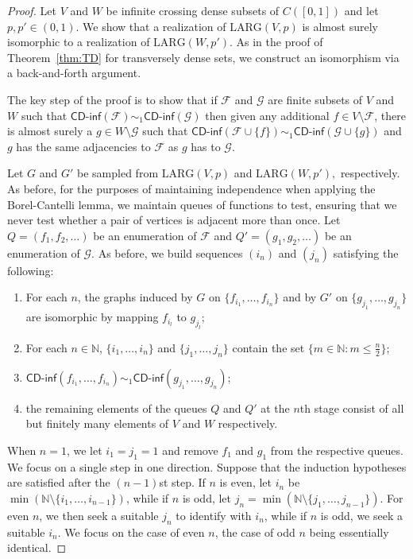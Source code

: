 \documentclass{daj}
\newcommand{\LARG}{\mathrm{LARG}}
\newcommand{\N}{\mathbb N}
\newcommand{\cdinf}{\textsf{CD-inf}}
\begin{document}
\begin{proof}
Let $V$ and $W$ be infinite crossing dense subsets of $C([0,1])$ and let $p,p'\in(0,1)$.
We show that a realization of $\LARG(V,p)$ is almost surely isomorphic to a realization of $\LARG(W,p')$.
As in the proof of Theorem~\ref{thm:TD} for transversely dense sets, we construct an isomorphism
via a back-and-forth argument.

The key step of the proof is to show that if $\mathcal F$ and $\mathcal G$ are finite subsets of $V$ and $W$
such that $\cdinf(\mathcal F)\sim_1\cdinf(\mathcal G)$ then given any additional
$f\in V\setminus\mathcal F$,
there is almost surely a $g\in W\setminus\mathcal G$ such that
$\cdinf(\mathcal F\cup \{f\})\sim_1\cdinf(\mathcal G\cup
\{g\})$ and $g$ has the same adjacencies to $\mathcal F$ as $g$ has to $\mathcal G$.

Let $G$ and $G'$ be sampled from $\LARG(V,p)$ and $\LARG(W,p'),$ respectively.
As before, for the purposes of maintaining independence when applying the Borel-Cantelli lemma,
we maintain queues of functions to test, ensuring that we never test whether a pair of vertices is adjacent
more than once.
Let $Q=(f_1,f_2,\ldots)$ be an enumeration of $\mathcal F$ and $Q'=(g_1,g_2,\ldots)$ be an
enumeration of $\mathcal G$.
As before, we build sequences $(i_n)$ and $(j_n)$ satisfying the following:
\begin{enumerate}[label=(T\ref{thm:BMRado}-\arabic*)]
\item
For each $n$, the graphs induced by $G$ on $\{f_{i_1},\ldots,f_{i_n}\}$ and by
$G'$ on $\{g_{j_1},\ldots,g_{j_n}\}$ are isomorphic by mapping $f_{i_l}$ to $g_{j_l}$;
\label{it:infind1}
\item For each $n\in\N$, $\{i_1,\ldots,i_n\}$ and $\{j_1,\ldots,j_n\}$ contain the set
$\{m\in\N\colon m\le \frac n2\}$;
\label{it:infind2}
\item $\cdinf(f_{i_1},\ldots,f_{i_n})\sim_1\cdinf(g_{j_1},\ldots,g_{j_n})$;\label{it:infind3}
\item the remaining elements of the queues $Q$ and $Q'$ at the $n$th stage consist
of all but finitely many elements of $V$ and $W$
respectively. \label{it:infind4}
\end{enumerate}

When $n=1$, we let $i_1=j_1=1$ and remove $f_1$ and $g_1$ from the respective queues.
We focus on a single step in one direction. Suppose that the induction hypotheses are
satisfied after the $(n-1)$st step.
If $n$ is even, let $i_n$ be $\min(\N\setminus\{i_1,\ldots,i_{n-1}\})$, while if $n$ is odd,
let $j_n=\min(\N\setminus\{j_1,\ldots,j_{n-1}\})$. For even $n$, we then seek a suitable $j_n$ to identify
with $i_n$, while if $n$ is odd, we seek a suitable $i_n$. We focus on the case of even $n$,
the case of odd $n$ being essentially identical.



\end{proof}
\end{document}
